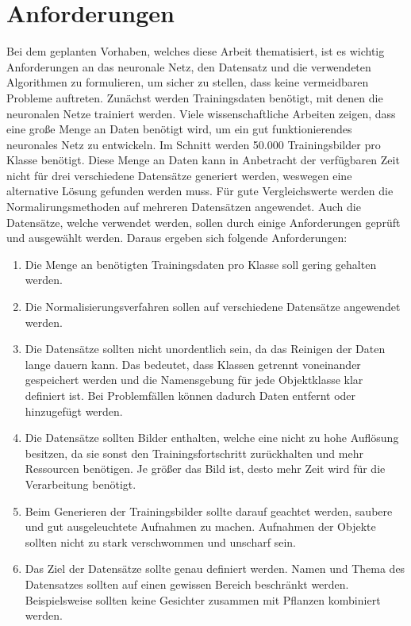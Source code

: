 \section{Anforderungen}\label{s.anforderungen}
Bei dem geplanten Vorhaben, welches diese Arbeit thematisiert, ist es wichtig Anforderungen an das neuronale Netz, den Datensatz und die verwendeten Algorithmen zu formulieren, um sicher zu stellen, dass keine vermeidbaren Probleme auftreten. Zunächst werden Trainingsdaten benötigt, mit denen die neuronalen Netze trainiert werden. Viele wissenschaftliche Arbeiten zeigen, dass eine große Menge an Daten benötigt wird, um ein gut funktionierendes neuronales Netz zu entwickeln. Im Schnitt werden 50.000 Trainingsbilder pro Klasse benötigt. Diese Menge an Daten kann in Anbetracht der verfügbaren Zeit nicht für drei verschiedene Datensätze generiert werden, weswegen eine alternative Lösung gefunden werden muss. Für gute Vergleichswerte werden die Normalirungsmethoden auf mehreren Datensätzen angewendet. Auch die Datensätze, welche verwendet werden, sollen durch einige Anforderungen geprüft und ausgewählt werden. Daraus ergeben sich folgende Anforderungen:
\begin{enumerate} 
\item Die Menge an benötigten Trainingsdaten pro Klasse soll gering gehalten werden.
\item Die Normalisierungsverfahren sollen auf verschiedene Datensätze angewendet werden.
\item Die Datensätze sollten nicht unordentlich sein, da das Reinigen der Daten lange dauern kann. Das bedeutet, dass Klassen getrennt voneinander gespeichert werden und die Namensgebung für jede Objektklasse klar definiert ist. Bei Problemfällen können dadurch Daten entfernt oder hinzugefügt werden.
\item Die Datensätze sollten Bilder enthalten, welche eine nicht zu hohe Auflösung besitzen, da sie sonst den Trainingsfortschritt zurückhalten und mehr Ressourcen benötigen. Je größer das Bild ist, desto mehr Zeit wird für die Verarbeitung benötigt.
\item Beim Generieren der Trainingsbilder sollte darauf geachtet werden, saubere und gut ausgeleuchtete Aufnahmen zu machen. Aufnahmen der Objekte sollten nicht zu stark verschwommen und unscharf sein. 
\item Das Ziel der Datensätze sollte genau definiert werden. Namen und Thema des Datensatzes sollten auf einen gewissen Bereich beschränkt werden. Beispielsweise sollten keine Gesichter zusammen mit Pflanzen kombiniert werden. 
\end{enumerate}
